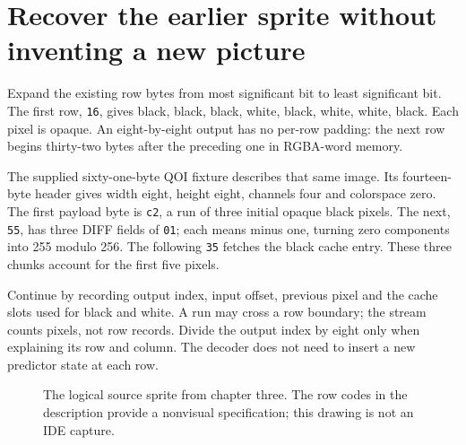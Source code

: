 \section{Recover the earlier sprite without inventing a new picture}
Expand the existing row bytes from most significant bit to least significant bit. The
first row, \texttt{16}, gives black, black, black, white, black, white, white, black.
Each pixel is opaque. An eight-by-eight output has no per-row padding: the next row
begins thirty-two bytes after the preceding one in RGBA-word memory.

The supplied sixty-one-byte QOI fixture describes that same image. Its fourteen-byte
header gives width eight, height eight, channels four and colorspace zero. The first
payload byte is \texttt{c2}, a run of three initial opaque black pixels. The next,
\texttt{55}, has three DIFF fields of \texttt{01}; each means minus one, turning
zero components into 255 modulo 256. The following \texttt{35} fetches the black cache
entry. These three chunks account for the first five pixels.

Continue by recording output index, input offset, previous pixel and the cache slots
used for black and white. A run may cross a row boundary; the stream counts pixels,
not row records. Divide the output index by eight only when explaining its row and
column. The decoder does not need to insert a new predictor state at each row.

\begin{figure}[htbp]
\centering
{}
\caption{The logical source sprite from chapter three. The row codes in the description provide a nonvisual specification; this drawing is not an IDE capture.}
\end{figure}
